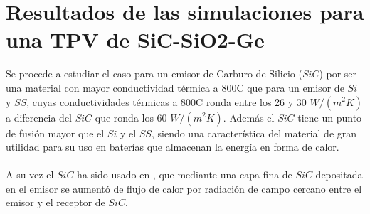 \section{Resultados de las simulaciones para una TPV de SiC-SiO2-Ge}
Se procede a estudiar el caso para un emisor de Carburo de Silicio ($SiC$) por ser una material con mayor conductividad térmica a 800\textdegree C que para un emisor de $Si$ y $SS$, cuyas conductividades térmicas a 800\textdegree C ronda entre los 26 y 30 $W/(m^2 K)$ a diferencia del $SiC$ que ronda los 60 $W/(m^2 K)$. Además el $SiC$ tiene un punto de fusión mayor que el $Si$ y el $SS$, siendo una característica del material de gran utilidad para su uso en baterías que almacenan la energía en forma de calor.\\\\
A su vez el $SiC$ ha sido usado en \cite{doi:Near_field_ThinFilm}, que mediante una capa fina de $SiC$ depositada en el emisor se aumentó de flujo de calor por radiación de campo cercano entre el emisor y el receptor de $SiC$.
